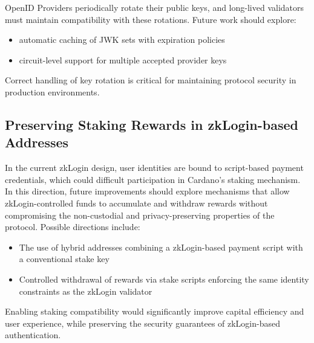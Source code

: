 \documentclass{article}
\begin{document}
OpenID Providers periodically rotate their public keys, and long-lived validators must maintain compatibility with these rotations. Future work should explore:
\begin{itemize}
    \item automatic caching of JWK sets with expiration policies
    \item circuit-level support for multiple accepted provider keys
\end{itemize}

Correct handling of key rotation is critical for maintaining protocol security in production environments.

\subsection{Preserving Staking Rewards in zkLogin-based Addresses}

In the current zkLogin design, user identities are bound to script-based payment credentials, which could difficult participation in Cardano’s staking mechanism. In this direction, future improvements should explore mechanisms that allow zkLogin-controlled funds to accumulate and withdraw rewards without compromising the non-custodial and privacy-preserving properties of the protocol. Possible directions include:
\begin{itemize}
    \item The use of hybrid addresses combining a zkLogin-based payment script with a conventional stake key
    \item Controlled withdrawal of rewards via stake scripts enforcing the same identity constraints as the zkLogin validator
\end{itemize}

Enabling staking compatibility would significantly improve capital efficiency and user experience, while preserving the security guarantees of zkLogin-based authentication.
\end{document}
